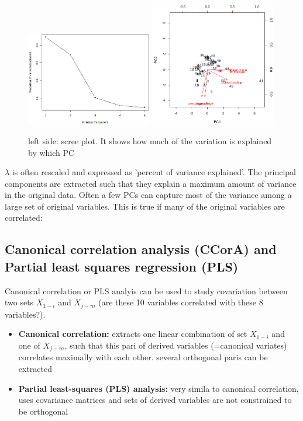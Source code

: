 \documentclass{article}
\begin{document}
\begin{figure}[h]
    \centering
    \includegraphics[width = 0.49\textwidth]{PCA/screeplot.png}
    \includegraphics[width = 0.49\textwidth]{PCA/pc1u2plot.png}
    \caption{left side: scree plot. It shows how much of the variation is explained by which PC}
\end{figure}

$\lambda$ is often rescaled and expressed as 'percent of variance explained'. The principal components are extracted such that they explain a maximum amount of variance in the original data. Often a few PCs can capture most of the variance among a large set of original variables. This is true if many of the original variables are correlated:

\subsection{Canonical correlation analysis (CCorA) and Partial least squares regression (PLS)}
Canonical correlation or PLS analyis can be used to study covariation between two sets $X_{1-i}$ and $X_{j-m}$ (are these 10 variables correlated with these 8 variables?).
\begin{itemize}
    \item \textbf{Canonical correlation:} extracts one linear combination of set $X_{1-i}$ and one of $X_{j-m}$, such that this pari of derived variables (=canonical variates) correlates maximally with each other. several orthogonal paris can be extracted
    \item \textbf{Partial least-squares (PLS) analysis:} very simila to canonical correlation, uses covariance matrices and sets of derived variables are not constrained to be orthogonal
\end{itemize}
\end{document}
